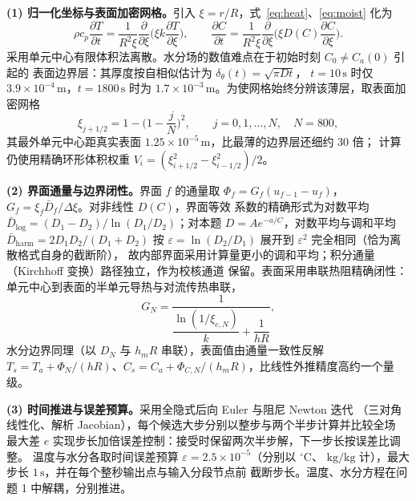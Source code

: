 \textbf{(1) 归一化坐标与表面加密网格。}引入 $\xi=r/R$，式~\eqref{eq:heat}、\eqref{eq:moist}
化为
\begin{equation}
  \rho c_p\frac{\partial T}{\partial t}
  =\frac{1}{R^2\xi}\frac{\partial}{\partial \xi}\Big(\xi k\frac{\partial T}{\partial\xi}\Big),
  \qquad
  \frac{\partial C}{\partial t}
  =\frac{1}{R^2\xi}\frac{\partial}{\partial \xi}\Big(\xi D(C)\frac{\partial C}{\partial\xi}\Big).
  \label{eq:norm}
\end{equation}
采用单元中心有限体积法离散。水分场的数值难点在于初始时刻 $C_0\neq C_a(0)$ 引起的
表面边界层：其厚度按自相似估计为 $\delta_\theta(t)=\sqrt{\pi D t}$，
$t=10\,\mathrm{s}$ 时仅 $3.9\times10^{-4}\,\mathrm{m}$，$t=1800\,\mathrm{s}$ 时为
$1.7\times10^{-3}\,\mathrm{m}$。为使网格始终分辨该薄层，取表面加密网格
\begin{equation}
  \xi_{j+1/2}=1-\Big(1-\frac{j}{N}\Big)^2,\qquad j=0,1,\dots,N,\quad N=800,
  \label{eq:mesh}
\end{equation}
其最外单元中心距真实表面 $1.25\times10^{-5}\,\mathrm{m}$，比最薄的边界层还细约 30 倍；
计算仍使用精确环形体积权重 $V_i=(\xi_{i+1/2}^2-\xi_{i-1/2}^2)/2$。

\textbf{(2) 界面通量与边界闭性。}界面 $f$ 的通量取
$\Phi_f=G_f(u_{f-1}-u_f)$，$G_f=\xi_f\bar D_f/\Delta\xi$。对非线性 $D(C)$，界面等效
系数的精确形式为对数平均 $\bar D_{\log}=(D_1-D_2)/\ln(D_1/D_2)$；对本题
$D=Ae^{-a/C}$，对数平均与调和平均 $\bar D_{\mathrm{harm}}=2D_1D_2/(D_1+D_2)$ 按
$\varepsilon=\ln(D_2/D_1)$ 展开到 $\varepsilon^2$ 完全相同（恰为离散格式自身的截断阶），
故内部界面采用计算量更小的调和平均；积分通量（Kirchhoff 变换）路径独立，作为校核通道
保留。表面采用串联热阻精确闭性：单元中心到表面的半单元导热与对流传热串联，
\begin{equation}
  G_N=\frac{1}{\dfrac{\ln(1/\xi_{c,N})}{k}+\dfrac{1}{hR}},
  \label{eq:GN}
\end{equation}
水分边界同理（以 $D_N$ 与 $h_mR$ 串联），表面值由通量一致性反解
$T_s=T_a+\Phi_N/(hR)$、$C_s=C_a+\Phi_{C,N}/(h_mR)$，比线性外推精度高约一个量级。

\textbf{(3) 时间推进与误差预算。}采用全隐式后向 Euler 与阻尼 Newton 迭代
（三对角线性化、解析 Jacobian），每个候选大步分别以整步与两个半步计算并比较全场
最大差 $e$ 实现步长加倍误差控制：接受时保留两次半步解，下一步长按误差比调整。
温度与水分各取时间误差预算 $\varepsilon=2.5\times10^{-5}$（分别以 $^{\circ}\mathrm{C}$、
$\mathrm{kg/kg}$ 计），最大步长 $1\,\mathrm{s}$，并在每个整秒输出点与输入分段节点前
截断步长。温度、水分方程在问题 1 中解耦，分别推进。


